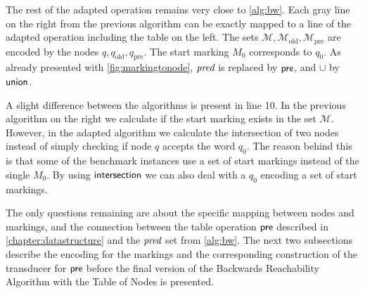 The rest of the adapted operation remains very close to \autoref{alg:bw}. Each gray line on the right from the previous algorithm can be exactly mapped to a line of the adapted operation including the table on the left. The sets $\mathcal{M}, \mathcal{M}_{\text{old}}, \mathcal{M}_{\text{pre}}$ are encoded by the nodes $q,q_{\text{old}},q_{\text{pre}}$. The start marking $M_{0}$ corresponds to $q_{0}$. 
As already presented with \autoref{fig:markingtonode}, $\operatorname{\textit{pred}}$ is replaced by $\operatorname{\textsf{pre}}$, and $\cup$ by $\operatorname{\textsf{union}}$. 


A slight difference between the algorithms is present in line 10. In the previous algorithm on the right we calculate if the start marking exists in the set $\mathcal{M}$. However, in the adapted algorithm we calculate the intersection of two nodes instead of simply checking if node $q$ accepts the word $q_{0}$. The reason behind this is that some of the benchmark instances use a set of start markings instead of the single $M_{0}$. By using $\operatorname{\textsf{intersection}}$ we can also deal with a $q_{0}$ encoding a set of start markings.


\par 


The only questions remaining are about the specific mapping between nodes and markings, and the connection between the table operation $\operatorname{\textsf{pre}}$ described in \autoref{chapter:datastructure} and the $\operatorname{\textit{pred}}$ set from \autoref{alg:bw}.
The next two subsections describe the encoding for the markings and the corresponding construction of the transducer for $\operatorname{\textsf{pre}}$ before the final version of the Backwards Reachability Algorithm with the Table of Nodes is presented.

